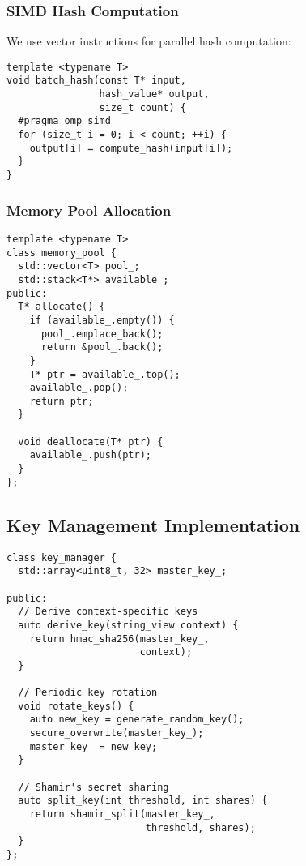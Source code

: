 \documentclass[10pt,conference]{IEEEtran}
\begin{document}
\subsubsection{SIMD Hash Computation}

We use vector instructions for parallel hash computation:

\begin{lstlisting}[caption={SIMD-accelerated hashing}]
template <typename T>
void batch_hash(const T* input,
                hash_value* output,
                size_t count) {
  #pragma omp simd
  for (size_t i = 0; i < count; ++i) {
    output[i] = compute_hash(input[i]);
  }
}
\end{lstlisting}

\subsubsection{Memory Pool Allocation}

\begin{lstlisting}[caption={Memory pool for temporary values}]
template <typename T>
class memory_pool {
  std::vector<T> pool_;
  std::stack<T*> available_;
public:
  T* allocate() {
    if (available_.empty()) {
      pool_.emplace_back();
      return &pool_.back();
    }
    T* ptr = available_.top();
    available_.pop();
    return ptr;
  }

  void deallocate(T* ptr) {
    available_.push(ptr);
  }
};
\end{lstlisting}

\subsection{Key Management Implementation}

\begin{lstlisting}[caption={Key derivation and management}]
class key_manager {
  std::array<uint8_t, 32> master_key_;

public:
  // Derive context-specific keys
  auto derive_key(string_view context) {
    return hmac_sha256(master_key_,
                       context);
  }

  // Periodic key rotation
  void rotate_keys() {
    auto new_key = generate_random_key();
    secure_overwrite(master_key_);
    master_key_ = new_key;
  }

  // Shamir's secret sharing
  auto split_key(int threshold, int shares) {
    return shamir_split(master_key_,
                        threshold, shares);
  }
};
\end{lstlisting}
\end{document}
